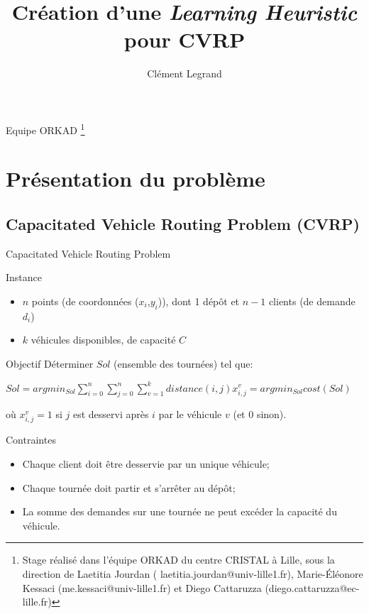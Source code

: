 \documentclass{beamer}
\title{Création d'une \emph{Learning Heuristic} pour CVRP}
\author{Clément Legrand}
\begin{document}
\begin{frame}[plain]
\titlepage
Equipe ORKAD \footnote{Stage réalisé dans l'équipe ORKAD du centre CRISTAL à Lille, sous la direction de Laetitia Jourdan ( laetitia.jourdan@univ-lille1.fr), Marie-Éléonore Kessaci (me.kessaci@univ-lille1.fr) et Diego Cattaruzza (diego.cattaruzza@ec-lille.fr)}
\end{frame}

\section{Présentation du problème}

\subsection{Capacitated Vehicle Routing Problem (CVRP)}
\footnotesize
\begin{frame}{Capacitated Vehicle Routing Problem}
\begin{block}{Instance}
\begin{itemize}
\item $n$ points (de coordonnées ($x_i$,$y_i$)), dont 1 dépôt et $n-1$ clients (de  demande $d_i$)
\item $k$ véhicules disponibles, de capacité $C$ 
\end{itemize}
\end{block}

\begin{exampleblock}{Objectif}
Déterminer $Sol$ (ensemble des tournées) tel que:

\centering
$ Sol = argmin_{Sol} \sum_{i = 0}^{n} \sum_{j = 0}^{n} \sum_{v = 1}^{k} distance(i,j) x_{i,j}^v = argmin_{Sol}cost(Sol)$

où $x_{i,j}^v = 1$ si $j$ est desservi après $i$ par le véhicule $v$ (et 0 sinon). 



\begin{alertblock}{Contraintes}
\begin{itemize}
\item Chaque client doit être desservie par un unique véhicule;
\item Chaque tournée doit partir et s'arrêter au dépôt;
\item La somme des demandes sur une tournée ne peut excéder la capacité du véhicule.
\end{itemize}
\end{alertblock}


\end{exampleblock}
\end{frame}
\end{document}

